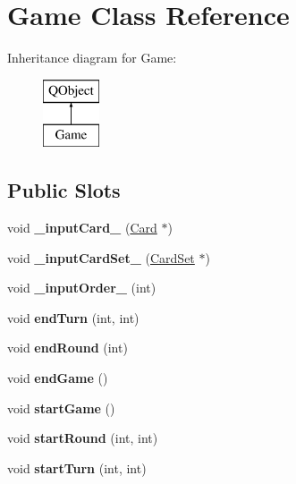 \hypertarget{class_game}{}\section{Game Class Reference}
\label{class_game}
Inheritance diagram for Game\+:\begin{figure}[H]
\begin{center}
\leavevmode
\includegraphics[height=2.000000cm]{class_game}
\end{center}
\end{figure}
\subsection*{Public Slots}
\begin{DoxyCompactItemize}
\item 
\mbox{\label{class_game_adb6ad159b4ba797928b16e7e5910f359}} 
void {\bfseries \+\_\+input\+Card\+\_\+} (\hyperlink{class_card}{Card} $\ast$)
\item 
\mbox{\label{class_game_a0a7c4c6cad38634438e69afd759fc9bc}} 
void {\bfseries \+\_\+input\+Card\+Set\+\_\+} (\hyperlink{class_card_set}{Card\+Set} $\ast$)
\item 
\mbox{\label{class_game_a07db123f744de984c1f96ea8eceee69c}} 
void {\bfseries \+\_\+input\+Order\+\_\+} (int)
\item 
\mbox{\label{class_game_a36487a0ad7c9e09889726c351a18c849}} 
void {\bfseries end\+Turn} (int, int)
\item 
\mbox{\label{class_game_ae892651cc87c8ea057a4b157923b3de9}} 
void {\bfseries end\+Round} (int)
\item 
\mbox{\label{class_game_a7d88788cf4b0da39a0245d418aa6f37a}} 
void {\bfseries end\+Game} ()
\item 
\mbox{\label{class_game_ae8638ccdb0ef3bf39a6affa30aa1258f}} 
void {\bfseries start\+Game} ()
\item 
\mbox{\label{class_game_ac8bdb1c74e094c5fb191fd8dd33cdb1e}} 
void {\bfseries start\+Round} (int, int)
\item 
\mbox{\label{class_game_ac09956e6593c89266c705040df122372}} 
void {\bfseries start\+Turn} (int, int)
\end{DoxyCompactItemize}
